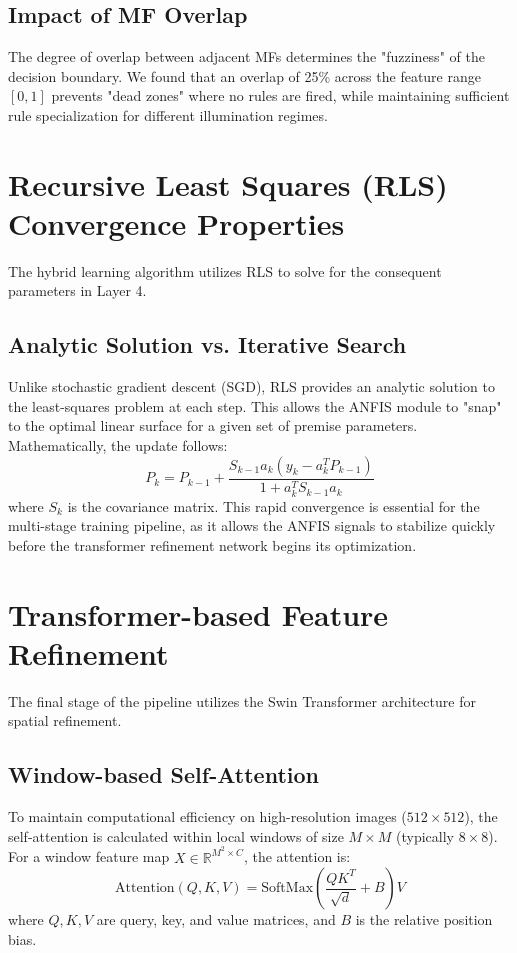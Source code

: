 \subsection{Impact of MF Overlap}
The degree of overlap between adjacent MFs determines the "fuzziness" of the decision boundary. We found that an overlap of 25\% across the feature range $[0, 1]$ prevents "dead zones" where no rules are fired, while maintaining sufficient rule specialization for different illumination regimes.

\section{Recursive Least Squares (RLS) Convergence Properties}
The hybrid learning algorithm utilizes RLS to solve for the consequent parameters in Layer 4. 

\subsection{Analytic Solution vs. Iterative Search}
Unlike stochastic gradient descent (SGD), RLS provides an analytic solution to the least-squares problem at each step. This allows the ANFIS module to "snap" to the optimal linear surface for a given set of premise parameters. Mathematically, the update follows:
\begin{equation}
    P_k = P_{k-1} + \frac{S_{k-1} a_k (y_k - a_k^T P_{k-1})}{1 + a_k^T S_{k-1} a_k}
\end{equation}
where $S_k$ is the covariance matrix. This rapid convergence is essential for the multi-stage training pipeline, as it allows the ANFIS signals to stabilize quickly before the transformer refinement network begins its optimization.

\section{Transformer-based Feature Refinement}
The final stage of the pipeline utilizes the Swin Transformer architecture for spatial refinement.

\subsection{Window-based Self-Attention}
To maintain computational efficiency on high-resolution images ($512 \times 512$), the self-attention is calculated within local windows of size $M \times M$ (typically $8 \times 8$). For a window feature map $X \in \mathbb{R}^{M^2 \times C}$, the attention is:
\begin{equation}
    \text{Attention}(Q, K, V) = \text{SoftMax}\left(\frac{QK^T}{\sqrt{d}} + B\right)V
\end{equation}
where $Q, K, V$ are query, key, and value matrices, and $B$ is the relative position bias.

